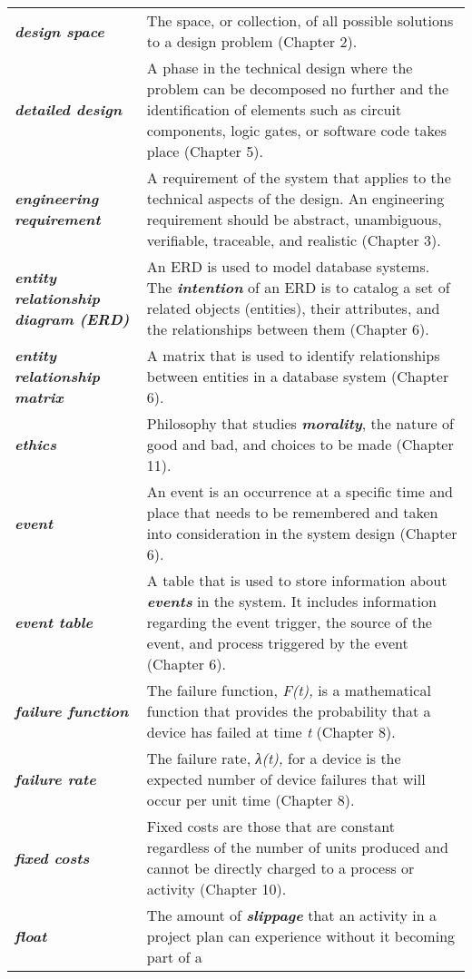 \begin{longtable}[]{@{}
  >{\raggedright\arraybackslash}p{}
  >{\raggedright\arraybackslash}p{}@{}}
\emph{\textbf{design space}} & The space, or collection, of all possible
solutions to a design problem (Chapter 2). \\
\emph{\textbf{detailed design}} & A phase in the technical design where
the problem can be decomposed no further and the identification of
elements such as circuit components, logic gates, or software code takes
place (Chapter 5). \\
\emph{\textbf{engineering requirement}} & A requirement of the system
that applies to the technical aspects of the design. An engineering
requirement should be abstract, unambiguous, verifiable, traceable, and
realistic (Chapter 3). \\
\emph{\textbf{entity relationship diagram (ERD)}} & An ERD is used to
model database systems. The \emph{\textbf{intention}} of an ERD is to
catalog a set of related objects (entities), their attributes, and the
relationships between them (Chapter 6). \\
\emph{\textbf{entity relationship matrix}} & A matrix that is used to
identify relationships between entities in a database system (Chapter
6). \\
\emph{\textbf{ethics}} & Philosophy that studies
\emph{\textbf{morality}}, the nature of good and bad, and choices to be
made (Chapter 11). \\
\emph{\textbf{event}} & An event is an occurrence at a specific time and
place that needs to be remembered and taken into consideration in the
system design (Chapter 6). \\
\emph{\textbf{event table}} & A table that is used to store information
about \emph{\textbf{events}} in the system. It includes information
regarding the event trigger, the source of the event, and process
triggered by the event (Chapter 6). \\
\emph{\textbf{failure function}} & The failure function, \emph{F(t),} is
a mathematical function that provides the probability that a device has
failed at time \emph{t} (Chapter 8). \\
\emph{\textbf{failure rate}} & The failure rate, \emph{λ(t),} for a
device is the expected number of device failures that will occur per
unit time (Chapter 8). \\
\emph{\textbf{fixed costs}} & Fixed costs are those that are constant
regardless of the number of units produced and cannot be directly
charged to a process or activity (Chapter 10). \\
\emph{\textbf{float}} & The amount of \emph{\textbf{slippage}} that an
activity in a project plan can experience without it becoming part of a

\end{longtable}
